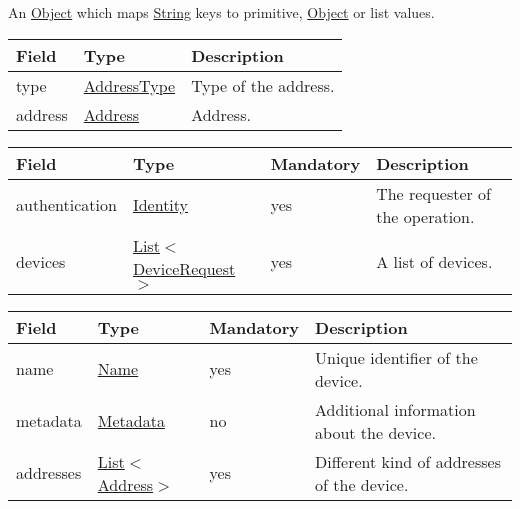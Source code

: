 \documentclass[a4paper]{arrowhead}
\newcommand{\pref}[1]{{\textcolor{ArrowheadGrey}{\hyperref[sec:model:primitives:#1]{#1}}}}
\begin{document}
\label{sec:model:Metadata}

An \pref{Object} which maps \pref{String} keys to primitive, \pref{Object} or list values.

\label{sec:model:AddressDescriptor}

\begin{table}[ht!]
\begin{tabularx}{\textwidth}{| p{4.25cm} | p{3.5cm} | X |} \hline
\rowcolor{gray!33} Field & Type & Description \\ \hline
type & \pref{AddressType} & Type of the address. \\ \hline
address & \pref{Address} & Address. \\ \hline
\end{tabularx}
\end{table}

\label{sec:model:DeviceListRequest}
 
\begin{table}[ht!]
\begin{tabularx}{\textwidth}{| p{3cm} | p{3.3cm} | p{2cm} | X |} \hline
\rowcolor{gray!33} Field & Type & Mandatory & Description \\ \hline
authentication & \hyperref[sec:model:Identity]{Identity} & yes & The requester of the operation. \\ \hline
devices & \pref{List}$<$\hyperref[sec:model:DeviceRequest]{DeviceRequest}$>$ & yes & A list of devices. \\ \hline
\end{tabularx}
\end{table}

\clearpage

\label{sec:model:DeviceRequest}
 
\begin{table}[ht!]
\begin{tabularx}{\textwidth}{| p{3cm} | p{3cm} | p{2cm} | X |} \hline
\rowcolor{gray!33} Field & Type & Mandatory & Description \\ \hline
name & \pref{Name} & yes & Unique identifier of the device. \\ \hline
metadata &\hyperref[sec:model:Metadata]{Metadata} & no & Additional information about the device. \\ \hline
addresses &  \pref{List}$<$\pref{Address}$>$ & yes & Different kind of addresses of the device.  \\ \hline
\end{tabularx}
\end{table}
\end{document}
